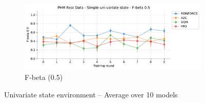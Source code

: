 \documentclass[a4paper, 12pt]{article}
\begin{document}
\begin{figure}[ht]
	\begin{subfigure}{\textwidth}
		\centering
		\includegraphics[width=\linewidth]{Singevariable_F05.pdf}  
		\caption{F-beta (0.5)}
		\label{fig:tr-ss-f05}
	\end{subfigure}
	\caption{Univariate state environment -- Average over 10 models}
	\label{fig:tr-ss-env}
\end{figure}
\end{document}
